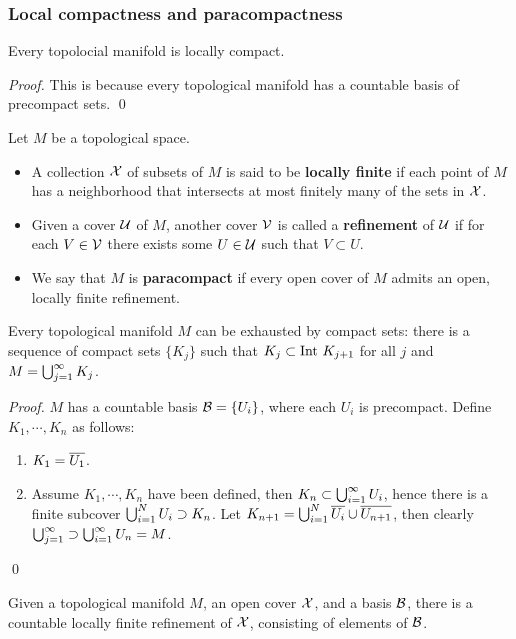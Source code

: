 \subsubsection*{Local compactness and paracompactness}
\begin{proposition}
    Every topolocial manifold is locally compact.
\end{proposition}
\begin{proof}
    This is because every topological manifold has a countable basis of precompact sets. \qed 
\end{proof}
\begin{definition}
    Let $M$ be a topological space.
    \begin{itemize}
    \item A collection $\mathcal{X}$ of subsets of $M$ is said to be \textbf{locally finite} if each point of $M$ has a neighborhood that intersects at most finitely many of the sets in $\mathcal{X}$. 
    \item Given a cover $\mathcal{U}$ of $M$, another cover $\mathcal{V}$ is called a \textbf{refinement} of $\mathcal{U}$ if for each $V \in \mathcal{V}$ there exists some $U \in \mathcal{U}$ such that $V \subset U$.
    \item We say that $M$ is \textbf{paracompact} if every open cover of $M$ admits an open, locally finite refinement. 
    \end{itemize}
\end{definition}
\begin{lemma}
    Every topological manifold $M$ can be exhausted by compact sets:
    there is a sequence of compact sets $\{K_j\}$ such that 
    $K_j \subset \mathrm{Int~} K_{j+1}$ for all $j$ and $M=\bigcup_{j=1}^{\infty}K_j$. 
\end{lemma}
\begin{proof}
    $M$ has a countable basis $\mathcal{B} = \{U_i\}$, where each $U_i$ is precompact. Define $K_1, \cdots, K_n$ as follows:
    \begin{enumerate}
    \item $K_1 = \overline{U_1}$.
    \item Assume $K_1, \cdots, K_n$ have been defined, then $K_n \subset \bigcup_{i=1}^{\infty}U_i$, hence there is a finite subcover $\bigcup_{i=1}^{N}U_i \supset K_n$. Let $K_{n+1} = \bigcup_{i=1}^{N}\overline{U_i} \cup \overline{U_{n+1}}$, 
    then clearly $\bigcup_{j=1}^{\infty} \supset \bigcup_{i=1}^{\infty}U_n = M$. 
    \end{enumerate}
    \qed 
\end{proof}
\begin{theorem}
    Given a topological manifold $M$, an open cover $\mathcal{X}$, and a basis $\mathcal{B}$, there is a countable locally finite refinement of $\mathcal{X}$, consisting of elements of $\mathcal{B}$.
\end{theorem}
